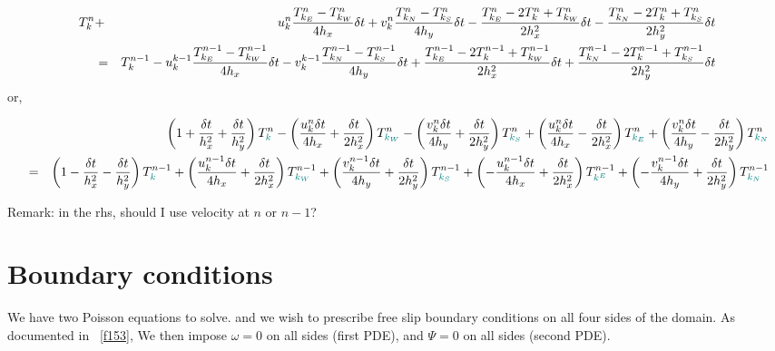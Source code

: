 \begin{eqnarray}
T_{k}^n
&+& 
 u^n_{k} \frac{T^n_{k_E}-T^n_{k_W}}{4h_x} \delta t
+ v^n_{k} \frac{T^n_{k_N}-T^n_{k_S}}{4h_y}\delta t
- \frac{T^n_{k_E}-2T^n_{k}+T^n_{k_W}}{2h_x^2}\delta t
- \frac{T^n_{k_N}-2T^n_{k}+T^n_{k_S}}{2h_y^2}\delta t \nonumber\\
&=&
T_{k}^{n-1}
- u^{k-1}_{k} \frac{T^{n-1}_{k_E}-T^{n-1}_{k_W}}{4h_x}\delta t
- v^{k-1}_{k} \frac{T^{n-1}_{k_N}-T^{n-1}_{k_S}}{4h_y}\delta t
+ \frac{T^{n-1}_{k_E}-2T^{n-1}_{k}+T^{n-1}_{k_W}}{2h_x^2}\delta t
+ \frac{T^{n-1}_{k_N}-2T^{n-1}_{k}+T^{n-1}_{k_S}}{2h_y^2}\delta t \nonumber
\end{eqnarray}
or,
\begin{footnotesize}
\begin{eqnarray}
&&\left(1 +\frac{\delta t}{h_x^2} +\frac{\delta t}{h_y^2} \right)  T^n_{{\color{teal} k}}
-\left(\frac{u_{k}^n \delta t}{4h_x} +\frac{\delta t}{2h_x^2} \right) T^n_{{\color{teal} k_W}}
-\left(\frac{v_{k}^n \delta t}{4h_y} +\frac{\delta t}{2h_y^2} \right) T^n_{{\color{teal} k_S}}+
\left(\frac{u_{k}^n \delta t}{4h_x} -\frac{\delta t}{2h_x^2} \right)  T^n_{{\color{teal} k_E}}+
\left(\frac{v_{k}^n \delta t}{4h_y} -\frac{\delta t}{2h_y^2} \right)  T^n_{{\color{teal} k_N}} \nonumber\\
&=&
 \left(1 -\frac{\delta t}{h_x^2} -\frac{\delta t}{h_y^2} \right)  T^{n-1}_{{\color{teal} k}}
+\left(\frac{u_{k}^{n-1} \delta t}{4h_x} +\frac{\delta t}{2h_x^2} \right) T^{n-1}_{{\color{teal}k_W}}
+\left(\frac{v_{k}^{n-1} \delta t}{4h_y} +\frac{\delta t}{2h_y^2} \right) T^{n-1}_{{\color{teal}k_S}}
+\left(-\frac{u_{k}^{n-1} \delta t}{4h_x} +\frac{\delta t}{2h_x^2} \right) T^{n-1}_{{\color{teal}k^E}}
+\left(-\frac{v_{k}^{n-1} \delta t}{4h_y} +\frac{\delta t}{2h_y^2} \right) T^{n-1}_{{\color{teal}k_N}} \nonumber
\end{eqnarray}
\end{footnotesize}


Remark: in the rhs, should I use velocity at $n$ or $n-1$?



\section*{Boundary conditions}

We have two Poisson equations to solve. 
and we wish to prescribe free slip 
boundary conditions on all four sides of the domain. 
As documented in \stone~\ref{f153}, 
We then impose $\omega=0$ on all sides (first PDE), 
and $\Psi=0$ on all sides (second PDE). 

